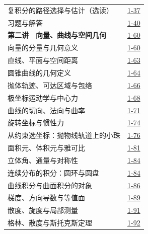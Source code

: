 \begin{longtable}{@{}p{}r@{}}
\hspace{1em}复积分的路径选择与估计（选读）&\href{course-page:1:42}{1-37}\\[2pt]
\hspace{1em}习题与解答&\href{course-page:1:45}{1-40}\\[2pt]
\textbf{第二讲　向量、曲线与空间几何}&\href{course-page:1:65}{1-60}\\[2pt]
\hspace{1em}向量的分量与几何意义&\href{course-page:1:65}{1-60}\\[2pt]
\hspace{1em}直线、平面与空间距离&\href{course-page:1:68}{1-63}\\[2pt]
\hspace{1em}圆锥曲线的几何定义&\href{course-page:1:69}{1-64}\\[2pt]
\hspace{1em}抛体轨迹、可达区域与包络&\href{course-page:1:71}{1-66}\\[2pt]
\hspace{1em}极坐标运动学与中心力&\href{course-page:1:73}{1-68}\\[2pt]
\hspace{1em}曲线的切向、法向与曲率&\href{course-page:1:76}{1-71}\\[2pt]
\hspace{1em}旋转坐标与惯性力&\href{course-page:1:79}{1-74}\\[2pt]
\hspace{1em}从约束选坐标：抛物线轨道上的小珠&\href{course-page:1:81}{1-76}\\[2pt]
\hspace{1em}面积元、体积元与雅可比&\href{course-page:1:86}{1-81}\\[2pt]
\hspace{1em}立体角、通量与对称性&\href{course-page:1:89}{1-84}\\[2pt]
\hspace{1em}连续分布的积分：圆环与圆盘&\href{course-page:1:89}{1-84}\\[2pt]
\hspace{1em}曲线积分与曲面积分的对象&\href{course-page:1:91}{1-86}\\[2pt]
\hspace{1em}梯度、方向导数与等值面&\href{course-page:1:94}{1-89}\\[2pt]
\hspace{1em}散度、旋度与局部测量&\href{course-page:1:96}{1-91}\\[2pt]
\hspace{1em}格林、散度与斯托克斯定理&\href{course-page:1:97}{1-92}\\[2pt]

\end{longtable}
